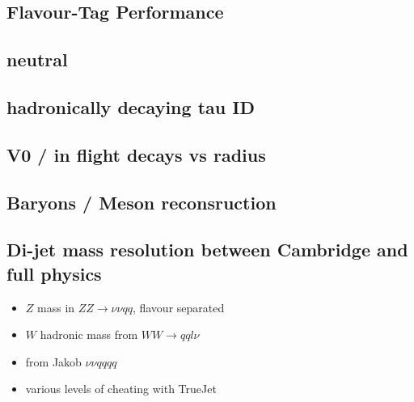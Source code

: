 
\subsection{Flavour-Tag Performance}

\subsection{neutral}
\subsection{hadronically decaying tau ID}
\subsection{V0 / in flight decays vs radius}
\subsection{Baryons / Meson reconsruction}
\subsection{Di-jet mass resolution between Cambridge and full physics}
\begin{itemize}
\item $Z$ mass in $ZZ \to \nu\nu qq$, flavour separated
\item $W$ hadronic mass from $WW \to qq l\nu$
\item from Jakob $\nu\nu qqqq$
\item various levels of cheating with TrueJet
\end{itemize}

